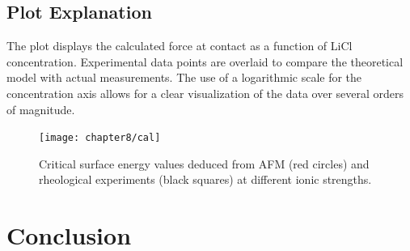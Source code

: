 \section*{Plot Explanation}

The plot displays the calculated force at contact as a function of LiCl concentration. Experimental data points are overlaid to compare the theoretical model with actual measurements. The use of a logarithmic scale for the concentration axis allows for a clear visualization of the data over several orders of magnitude.

\begin{figure}[h!]
\centering
\texttt{[image: chapter8/cal]}
\caption{Critical surface energy values deduced from AFM (red circles) and rheological experiments (black squares) at different ionic strengths.}
\label{fig:critical_surface_energy}
\end{figure}

\newpage
\newpage

\chapter{Conclusion}

